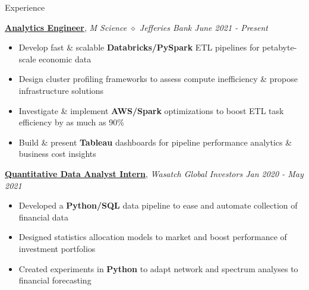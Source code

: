 \documentclass{resume/resume}
\begin{document}
\begin{rSection}{Experience}

    \href{https://mscience.com/}{\bf Analytics Engineer}, {\em M Science $\diamond$ Jefferies Bank \hfill June 2021 - Present}
    \vspace{-6pt}
    \begin{itemize}[nosep]
        \item Develop fast \& scalable {\bf Databricks/PySpark} ETL pipelines for petabyte-scale economic data
        \item Design cluster profiling frameworks to assess compute inefficiency \& propose infrastructure solutions
        \item Investigate \& implement {\bf AWS/Spark} optimizations to boost ETL task efficiency by as much as 90\%
        \item Build \& present {\bf Tableau} dashboards for pipeline performance analytics \& business cost insights
    \end{itemize}

    \href{https://wasatchglobal.com/}{\bf Quantitative Data Analyst Intern}, {\em Wasatch Global Investors \hfill Jan 2020 - May 2021}
    \vspace{-6pt}
    \begin{itemize}[nosep]
        \item Developed a {\bf Python/SQL} data pipeline to ease and automate collection of financial data
        \item Designed statistics allocation models to market and boost performance of investment portfolios
        \item Created experiments in {\bf Python} to adapt network and spectrum analyses to financial forecasting
    \end{itemize}


\end{rSection}
\end{document}
